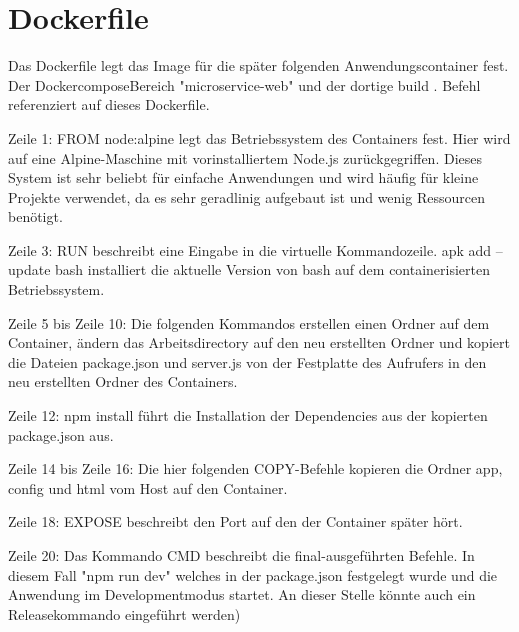 
\chapter{Dockerfile}
\label{ch:Dockerfile}
Das Dockerfile legt das Image für die später folgenden Anwendungscontainer fest. Der DockercomposeBereich "microservice-web" und der dortige build . Befehl referenziert auf dieses Dockerfile.

Zeile 1: FROM node:alpine legt das Betriebssystem des Containers fest. Hier wird auf eine Alpine-Maschine mit vorinstalliertem Node.js zurückgegriffen. Dieses System ist sehr beliebt für einfache Anwendungen und wird häufig für kleine Projekte verwendet, da es sehr geradlinig aufgebaut ist und wenig Ressourcen benötigt.

Zeile 3: RUN beschreibt eine Eingabe in die virtuelle Kommandozeile. apk add --update bash installiert die aktuelle Version von bash auf dem containerisierten Betriebssystem.

Zeile 5 bis Zeile 10: Die folgenden Kommandos erstellen einen Ordner auf dem Container, ändern das Arbeitsdirectory auf den neu erstellten Ordner und kopiert die Dateien package.json und server.js von der Festplatte des Aufrufers in den neu erstellten Ordner des Containers.

Zeile 12: npm install führt die Installation der Dependencies aus der kopierten package.json aus.

Zeile 14 bis Zeile 16: Die hier folgenden COPY-Befehle kopieren die Ordner app, config und html vom Host auf den Container.

Zeile 18: EXPOSE beschreibt den Port auf den der Container später hört.

Zeile 20: Das Kommando CMD beschreibt die final-ausgeführten Befehle. In diesem Fall "npm run dev" welches in der package.json festgelegt wurde und die Anwendung im Developmentmodus startet. An dieser Stelle könnte auch ein Releasekommando eingeführt werden)